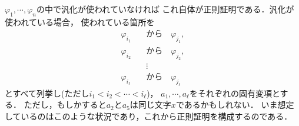 	\begin{metaprf}
		$\varphi_{1},\cdots,\varphi_{n}$の中で汎化が使われていなければ
		これ自体が正則証明である．汎化が使われている場合，
		使われている箇所を
		\begin{align}
			\varphi_{i_{1}} \quad &\mbox{から} \quad \varphi_{j_{1}}, \\
			\varphi_{i_{2}} \quad &\mbox{から} \quad \varphi_{j_{2}}, \\
			&\vdots \\
			\varphi_{i_{\ell}} \quad &\mbox{から} \quad \varphi_{j_{\ell}}
		\end{align}
		とすべて列挙し(ただし$i_{1} < i_{2} < \cdots < i_{\ell}$)，
		$a_{1},\cdots,a_{\ell}$をそれぞれの固有変項とする．
		ただし，もしかすると$a_{2}$と$a_{5}$は同じ文字$x$であるかもしれない．
		いま想定しているのはこのような状況であり，これから正則証明を構成するのである．
		

\end{metaprf}
